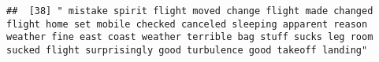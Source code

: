 \documentclass[
]{article}
\begin{document}
\begin{verbatim}
##  [38] " mistake spirit flight moved change flight made changed flight home set mobile checked canceled sleeping apparent reason weather fine east coast weather terrible bag stuff sucks leg room sucked flight surprisingly good turbulence good takeoff landing"                                                                                                                                                                                                                                                                                                                                                                                                                                                                                                                                                                                                                                                                                                                                                                                                                                                                                                                                                                                                                                                                                                                                                                                                                                                                                                                                                                                                                                                                                                                                    

\end{verbatim}
\end{document}
